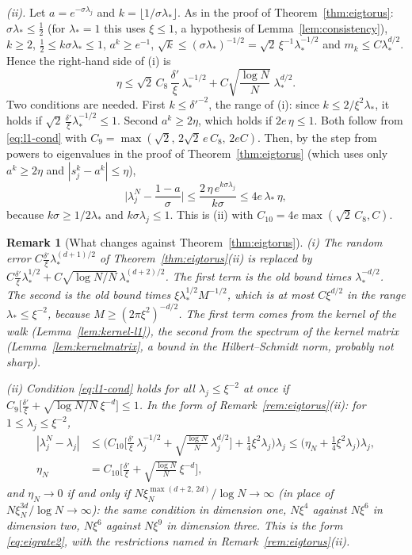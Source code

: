 \documentclass[11pt,a4paper]{article}
\makeatletter
\theoremstyle{stmt}
\theoremstyle{defn}
\theoremstyle{rmk}
\newtheorem{remark}[theorem]{Remark}
\renewenvironment{proof}[1][\proofname]{\par\pushQED{\qed}\normalfont\topsep6\p@\@plus6\p@\relax
  \trivlist\item[\hskip\labelsep{\sffamily\itshape\small #1.}]\ignorespaces}{\popQED\endtrivlist\@endpefalse}
\numberwithin{equation}{section}
\makeatother
\begin{document}
{\begin{proof}
\emph{(ii).} Let $a=e^{-\sigma\lambda_j}$ and $k=\lfloor1/\sigma\lambda_*\rfloor$. As in the proof of
Theorem~\ref{thm:eigtorus}: $\sigma\lambda_*\le\frac12$ (for $\lambda_*=1$ this uses $\xi\le1$, a hypothesis of Lemma~\ref{lem:consistency}), $k\ge2$, $\frac12\le k\sigma\lambda_*\le1$,
$a^k\ge e^{-1}$, $\sqrt k\le(\sigma\lambda_*)^{-1/2}=\sqrt2\,\xi^{-1}\lambda_*^{-1/2}$ and $m_k\le C\lambda_*^{d/2}$. Hence
the right-hand side of (i) is
\[
 \eta\le\sqrt2\,C_8\,\frac{\delta'}\xi\,\lambda_*^{-1/2}+C\sqrt{\frac{\log N}N}\;\lambda_*^{d/2}.
\]
Two conditions are needed. First $k\le\delta'^{-2}$, the range of (i): since $k\le2/\xi^2\lambda_*$, it holds
if $\sqrt2\,\frac{\delta'}\xi\lambda_*^{-1/2}\le1$. Second $a^k\ge2\eta$, which holds if $2e\,\eta\le1$. Both
follow from \eqref{eq:l1-cond} with $C_9=\max(\sqrt2,\,2\sqrt2\,e\,C_8,\,2eC)$. Then, by the step from
powers to eigenvalues in the proof of Theorem~\ref{thm:eigtorus} (which uses only $a^k\ge2\eta$ and
$|s_j^k-a^k|\le\eta$),
\[
 \Big|\lambda^N_j-\frac{1-a}\sigma\Big|\le\frac{2\,\eta\,e^{k\sigma\lambda_j}}{k\sigma}\le4e\,\lambda_*\,\eta ,
\]
because $k\sigma\ge1/2\lambda_*$ and $k\sigma\lambda_j\le1$. This is (ii) with $C_{10}=4e\max(\sqrt2\,C_8,C)$.
\end{proof}

\begin{remark}[What changes against Theorem~\ref{thm:eigtorus}]\label{rem:eigtorus-l1}
(i) The random error $C\frac{\delta'}\xi\lambda_*^{(d+1)/2}$ of Theorem~\ref{thm:eigtorus}(ii) is replaced
by $C\frac{\delta'}\xi\lambda_*^{1/2}+C\sqrt{\log N/N}\,\lambda_*^{(d+2)/2}$. The first term is the old bound
times $\lambda_*^{-d/2}$. The second is the old bound times $\xi\lambda_*^{1/2}M^{-1/2}$, which is at most
$C\xi^{d/2}$ in the range $\lambda_*\le\xi^{-2}$, because $M\ge(2\pi\xi^2)^{-d/2}$. The first term comes from the kernel of the
walk (Lemma~\ref{lem:kernel-l1}), the second from the spectrum of the kernel matrix
(Lemma~\ref{lem:kernelmatrix}, a bound in the Hilbert--Schmidt norm, probably not sharp).

(ii) Condition \eqref{eq:l1-cond} holds for all $\lambda_j\le\xi^{-2}$ at once if
$C_9\big[\frac{\delta'}\xi+\sqrt{\log N/N}\,\xi^{-d}\big]\le1$. In the form of
Remark~\ref{rem:eigtorus}(ii): for $1\le\lambda_j\le\xi^{-2}$,
\begin{align*}
 |\lambda^N_j-\lambda_j|&\le\Big(C_{10}\Big[\frac{\delta'}\xi\,\lambda_j^{-1/2}+\sqrt{\frac{\log N}N}\,\lambda_j^{d/2}\Big]
 +\tfrac14\xi^2\lambda_j\Big)\lambda_j\le\big(\eta_N+\tfrac14\xi^2\lambda_j\big)\lambda_j,\\
 \eta_N&=C_{10}\Big[\frac{\delta'}\xi+\sqrt{\frac{\log N}N}\,\xi^{-d}\Big],
\end{align*}
and $\eta_N\to0$ if and only if $N\xi_N^{\max(d+2,\,2d)}/\log N\to\infty$ (in place of
$N\xi_N^{3d}/\log N\to\infty$): the same condition in dimension one, $N\xi^4$ against $N\xi^6$ in dimension
two, $N\xi^6$ against $N\xi^9$ in dimension three. This is the form \eqref{eq:eigrate2}, with the restrictions named in Remark~\ref{rem:eigtorus}(ii).


\end{remark}}
\end{document}
